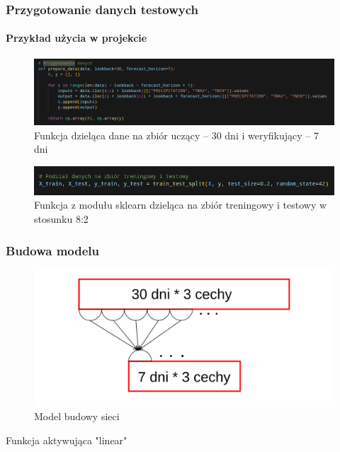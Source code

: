 \documentclass[usepdftitle=false,24pt]{beamer}
\begin{document}
\begin{frame}
    \frametitle{Przygotowanie danych testowych}
    \framesubtitle{Przykład użycia w projekcie}

    \begin{figure}
        \includegraphics[width=\textwidth]{images/prepare_data.png}
        \caption{Funkcja dzieląca dane na zbiór uczący -- 30 dni i weryfikujący -- 7 dni}
    \end{figure}


    \begin{figure}
        \includegraphics[width=\textwidth]{images/train_split.png}
        \caption{Funkcja z modułu sklearn \cite{split-sklearn} dzieląca na zbiór treningowy i testowy w stosunku 8:2}
    \end{figure}
\end{frame}

\begin{frame}
    \frametitle{Budowa modelu}

    \begin{figure}
        \includegraphics[width=\textwidth]{images/budowa_sieci.png}
        \caption{Model budowy sieci}
    \end{figure}

    \hspace*{1cm}

    \begin{center}
        Funkcja aktywująca "linear"
    \end{center}

\end{frame}
\end{document}
